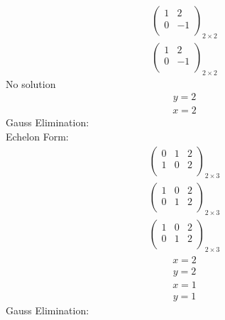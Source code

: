 \documentclass{article}
\begin{document}
\begin{align*}
\left(
\begin{array}{c|c}
1 & 2\\
0 & -1\\
\end{array}
\right)_{2\times 2}
\end{align*}
\begin{align*}
\left(
\begin{array}{c|c}
1 & 2\\
0 & -1\\
\end{array}
\right)_{2\times 2}
\end{align*}
No solution\\
\begin{align*}
y=2\end{align*}
\begin{align*}
x=2\end{align*}
Gauss Elimination:\\
Echelon Form:\\
\begin{align*}
\left(
\begin{array}{cc|c}
0 & 1 & 2\\
1 & 0 & 2\\
\end{array}
\right)_{2\times 3}
\end{align*}
\begin{align*}
\left(
\begin{array}{cc|c}
1 & 0 & 2\\
0 & 1 & 2\\
\end{array}
\right)_{2\times 3}
\end{align*}
\begin{align*}
\left(
\begin{array}{cc|c}
1 & 0 & 2\\
0 & 1 & 2\\
\end{array}
\right)_{2\times 3}
\end{align*}
\begin{align*}
x=2\end{align*}
\begin{align*}
y=2\end{align*}
\begin{align*}
x=1\end{align*}
\begin{align*}
y=1\end{align*}
Gauss Elimination:\\
\end{document}
